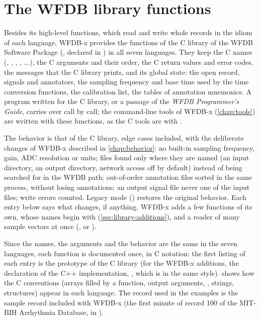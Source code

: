
\chapter{The WFDB library functions}
\label{chap:library}
\setlength{\emergencystretch}{2.5em}

Besides its high-level functions, which read and write whole records in the
idiom of each language, WFDB-x provides the functions of the C library of the
WFDB Software Package \wfdbversion{} (, declared in
) in all seven languages. They keep the C names
(, , , , ...), the C
arguments and their order, the C return values and error codes, the messages
that the C library prints, and its global state: the open record, signals and
annotators, the sampling frequency and base time used by the time conversion
functions, the calibration list, the tables of annotation mnemonics. A program
written for the C library, or a passage of the \emph{WFDB Programmer's Guide},
carries over call by call; the command-line tools of WFDB-x
(\cref{chap:tools}) are written with these functions, as the C tools are with
.

The behavior is that of the C library, edge cases included, with the
deliberate changes of WFDB-x described in \cref{chap:behavior}: no built-in
sampling frequency, gain, ADC resolution or units; files found only where
they are named (an input directory, an output directory, network access off
by default) instead of being searched for in the WFDB path; out-of-order
annotation files sorted in the same process, without losing annotations; an
output signal file never one of the input files; write errors counted. Legacy
mode () restores the original behavior. Each entry
below says what changes, if anything. WFDB-x adds a few functions of its own,
whose names begin with  (\cref{sec:library-additions}), and a
reader of many sample vectors at once (, or ).

Since the names, the arguments and the behavior are the same in the seven
languages, each function is documented once, in C notation: the first listing
of each entry is the prototype of the C library (for the WFDB-x additions,
the declaration of the C++ implementation, ,
which is in the same style).  shows how the C
conventions (arrays filled by a function, output arguments, ,
strings, structures) appear in each language. The record  used in
the examples is the sample record included with WFDB-x (the first minute of
record 100 of the MIT-BIH Arrhythmia Database, in ).


